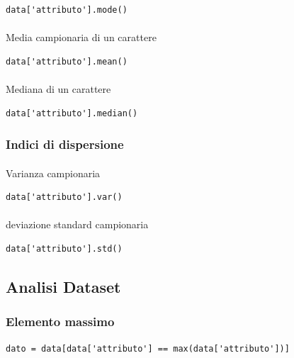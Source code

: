 \documentclass{article}
\begin{document}
\begin{lstlisting}
data['attributo'].mode()
\end{lstlisting}

\paragraph{}{Media campionaria di un carattere}

\begin{lstlisting}
data['attributo'].mean()
\end{lstlisting}

\paragraph{}{Mediana di un carattere}

\begin{lstlisting}
data['attributo'].median()
\end{lstlisting}

\subsubsection*{Indici di dispersione}

\paragraph{}{Varianza campionaria}

\begin{lstlisting}
data['attributo'].var()
\end{lstlisting}

\paragraph{}{deviazione standard campionaria}

\begin{lstlisting}
data['attributo'].std()
\end{lstlisting}

\subsection*{Analisi Dataset}

\subsubsection*{Elemento massimo}

\begin{lstlisting}
dato = data[data['attributo'] == max(data['attributo'])]
\end{lstlisting}
\end{document}
